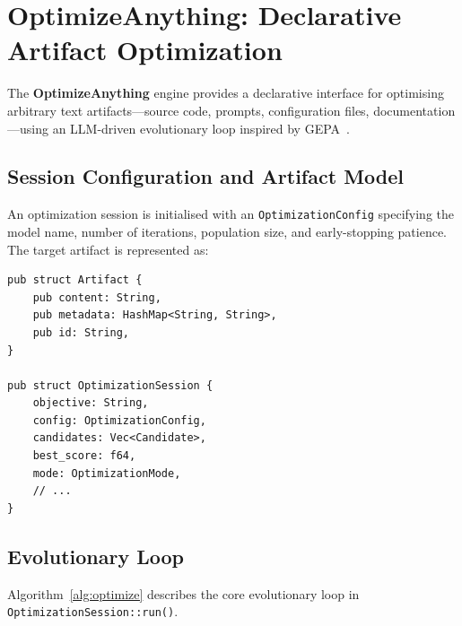 \documentclass[11pt]{article}
\begin{document}
\section{OptimizeAnything: Declarative Artifact Optimization}
\nopagebreak[4]
\label{sec:optimize}

The \textbf{OptimizeAnything} engine provides a declarative interface for
optimising arbitrary text artifacts---source code, prompts, configuration files,
documentation---using an LLM-driven evolutionary loop inspired by
GEPA~\cite{agrawal2025gepa}.

\subsection{Session Configuration and Artifact Model}

An optimization session is initialised with an \texttt{OptimizationConfig}
specifying the model name, number of iterations, population size, and early-stopping
patience. The target artifact is represented as:

\nopagebreak[4]
\begin{lstlisting}[caption={Rust artifact and session initialisation.}]
pub struct Artifact {
    pub content: String,
    pub metadata: HashMap<String, String>,
    pub id: String,
}

pub struct OptimizationSession {
    objective: String,
    config: OptimizationConfig,
    candidates: Vec<Candidate>,
    best_score: f64,
    mode: OptimizationMode,
    // ...
}
\end{lstlisting}

\subsection{Evolutionary Loop}

Algorithm~\ref{alg:optimize} describes the core evolutionary loop in
\texttt{OptimizationSession::run()}.
\end{document}
